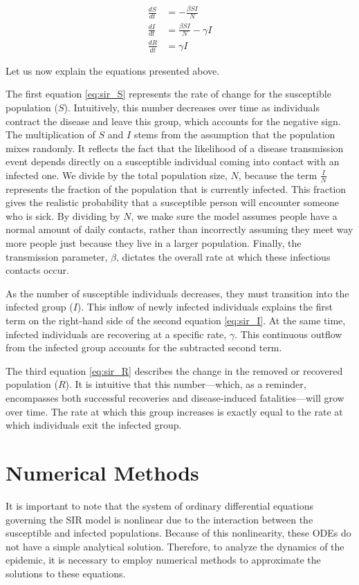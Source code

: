\documentclass[12pt,a4paper]{article}
\begin{document}
\begin{align}
    \frac{dS}{dt} &= -\frac{\beta S I}{N} \label{eq:sir_S} \\
    \frac{dI}{dt} &= \frac{\beta S I}{N} - \gamma I \label{eq:sir_I} \\
    \frac{dR}{dt} &= \gamma I \label{eq:sir_R}
\end{align}

Let us now explain the equations presented above.

The first equation \eqref{eq:sir_S} represents the rate of change for the susceptible population ($S$). Intuitively, this number decreases over time as individuals contract the disease and leave this group, which accounts for the negative sign. The multiplication of $S$ and $I$ stems from the assumption that the population mixes randomly. It reflects the fact that the likelihood of a disease transmission event depends directly on a susceptible individual coming into contact with an infected one. We divide by the total population size, $N$, because the term $\frac{I}{N}$ represents the fraction of the population that is currently infected. This fraction gives the realistic probability that a susceptible person will encounter someone who is sick. By dividing by $N$, we make sure the model assumes people have a normal amount of daily contacts, rather than incorrectly assuming they meet way more people just because they live in a larger population. Finally, the transmission parameter, $\beta$, dictates the overall rate at which these infectious contacts occur.


As the number of susceptible individuals decreases, they must transition into the infected group ($I$). This inflow of newly infected individuals explains the first term on the right-hand side of the second equation \eqref{eq:sir_I}. At the same time, infected individuals are recovering at a specific rate, $\gamma$. This continuous outflow from the infected group accounts for the subtracted second term.

The third equation \eqref{eq:sir_R} describes the change in the removed or recovered population ($R$). It is intuitive that this number---which, as a reminder, encompasses both successful recoveries and disease-induced fatalities---will grow over time. The rate at which this group increases is exactly equal to the rate at which individuals exit the infected group.

\section{Numerical Methods}
It is important to note that the system of ordinary differential equations governing the SIR model is nonlinear due to the interaction between the susceptible and infected populations. Because of this nonlinearity, these ODEs do not have a simple analytical solution. Therefore, to analyze the dynamics of the epidemic, it is necessary to employ numerical methods to approximate the solutions to these equations.
\end{document}
